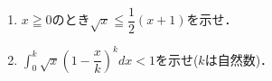 \documentclass[../../main.tex]{subfiles}
\begin{document}
\begin{enumerate}
  \item $x\geqq0$のとき$\displaystyle\sqrt{x}\leqq\dfrac{1}{2}(x+1)$を示せ．
  \item $\displaystyle\int_0^k\sqrt{x}{ \left( 1-\dfrac{x}{k} \right) }^kdx<1$を示せ($k$は自然数)．
\end{enumerate}
\end{document}

